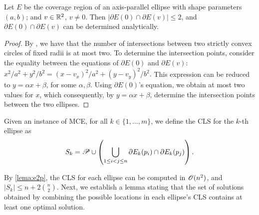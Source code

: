 \begin{lem}\label{lema:e2p}
	Let $E$ be the coverage region of an axis-parallel ellipse with shape parameters $(a,b)$; and $v \in \mathbb{R}^2$, $v\neq0$. Then $|\partial E(0) \cap \partial E(v)| \le 2$, and $\partial E(0) \cap \partial E(v)$ can be determined analytically.
\end{lem}

\begin{proof}
	By \cite{bi}, we have that the number of intersections between two strictly convex circles of fixed radii is at most two. To determine the intersection points, consider the equality between the equations of $\partial E(0)$ and $\partial E(v)$:
	$x^2/a^2 + y^2/b^2 = (x-v_x)^2/a^2 + (y-v_y)^2/b^2.$
	This expression can be reduced to $y=\alpha x + \beta$, for some $\alpha, \beta$. Using $\partial E(0)$'s equation, we obtain at most two values for $x$, which consequently, by $y=\alpha x + \beta$, determine the intersection points between the two ellipses.
\end{proof}

\begin{definition}\label{def:cls_mce}
	Given an instance of MCE, for all $k \in \{1, \dots, m\}$, we define the CLS for the $k$-th ellipse as
	\begin{equation}
	S_k = \mathscr{P} \cup \left(\bigcup_{1 \le i < j \le n} \partial E_k(p_i) \cap \partial E_k(p_j) \right).
	\end{equation}
\end{definition}

By \autoref{lema:e2p}, the CLS for each ellipse can be computed in $\mathscr{O}(n^2)$, and $|S_k| \le n + 2\binom{n}{2}$. Next, we establish a lemma stating that the set of solutions obtained by combining the possible locations in each ellipse's CLS contains at least one optimal solution.

